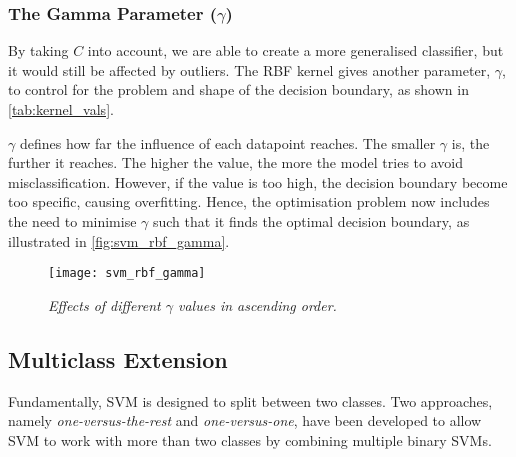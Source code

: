 \subsubsection{The Gamma Parameter ($\gamma$)}
By taking $C$ into account, we are able to create a more generalised classifier, but it would still be affected by outliers. The RBF kernel gives another parameter, $\gamma$, to control for the problem and shape of the decision boundary, as shown in \autoref{tab:kernel_vals}.

$\gamma$ defines how far the influence of each datapoint reaches. The smaller $\gamma$ is, the further it reaches. The higher the value, the more the model tries to avoid misclassification. However, if the value is too high, the decision boundary become too specific, causing overfitting. Hence, the optimisation problem now includes the need to minimise $\gamma$ such that it finds the optimal decision boundary, as illustrated in \autoref{fig:svm_rbf_gamma}.

\begin{figure}[H]
  \centering
  \texttt{[image: svm\_rbf\_gamma]}
  \caption{\textit{Effects of different $\gamma$ values in ascending order.}}
  \label{fig:svm_rbf_gamma}
\end{figure}


\subsection{Multiclass Extension}
Fundamentally, SVM is designed to split between two classes. Two approaches, namely \textit{one-versus-the-rest} and \textit{one-versus-one}, have been developed to allow SVM to work with more than two classes by combining multiple binary SVMs.

